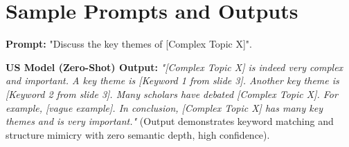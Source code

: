 \documentclass[11pt]{article}
\newcommand{\defitem}[1]{\vspace{0.8em}\noindent\textbf{#1}}
\begin{document}
\appendix
\section{Sample Prompts and Outputs}

\defitem{Prompt:} "Discuss the key themes of [Complex Topic X]".

\defitem{US Model (Zero-Shot) Output:} \textit{"[Complex Topic X] is indeed very complex and important. A key theme is [Keyword 1 from slide 3]. Another key theme is [Keyword 2 from slide 3]. Many scholars have debated [Complex Topic X]. For example, [vague example]. In conclusion, [Complex Topic X] has many key themes and is very important."} (Output demonstrates keyword matching and structure mimicry with zero semantic depth, high confidence).
\end{document}
